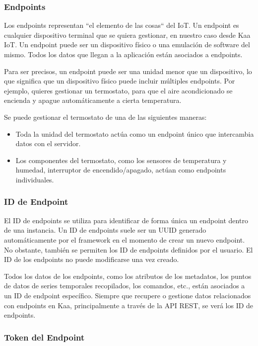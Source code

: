 {\subsubsection{Endpoints}

Los endpoints representan ``el elemento de las cosas`` del IoT. Un endpoint es cualquier dispositivo terminal que se quiera gestionar, en nuestro caso desde Kaa IoT. Un endpoint puede ser un dispositivo físico o una emulación de software del mismo. Todos los datos que llegan a la aplicación están asociados a endpoints. \cite{kaaiotConcepts}

Para ser precisos, un endpoint puede ser una unidad menor que un dispositivo, lo que significa que un dispositivo físico puede incluir múltiples endpoints. Por ejemplo, quieres gestionar un termostato, para que el aire acondicionado se encienda y apague automáticamente a cierta temperatura.

Se puede gestionar el termostato de una de las siguientes maneras:

\begin{itemize}
    \item Toda la unidad del termostato actúa como un endpoint único que intercambia datos con el servidor.
    \item Los componentes del termostato, como los sensores de temperatura y humedad, interruptor de encendido/apagado, actúan como endpoints individuales.
\end{itemize}

\subsubsection{ID de Endpoint}

El ID de endpoints se utiliza para identificar de forma única un endpoint dentro de una instancia. Un ID de endpoints suele ser un UUID generado automáticamente por el framework en el momento de crear un nuevo endpoint. No obstante, también se permiten los ID de endpoints definidos por el usuario. El ID de los endpoints no puede modificarse una vez creado.

Todos los datos de los endpoints, como los atributos de los metadatos, los puntos de datos de series temporales recopilados, los comandos, etc., están asociados a un ID de endpoint específico. Siempre que recupere o gestione datos relacionados con endpoints en Kaa, principalmente a través de la API REST, se verá los ID de endpoints.

\subsubsection{Token del Endpoint}

}
